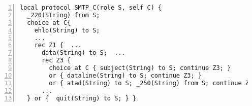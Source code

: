 \begin{lstlisting}[numbers=left]
local protocol SMTP_C(role S, self C) {
  _220(String) from S;
  choice at C{
    ehlo(String) to S;
    ...
    rec Z1 {  ...
      data(String) to S;  ...
      rec Z3 {
        choice at C { subject(String) to S; continue Z3; }
        or { dataline(String) to S; continue Z3; }
        or { atad(String) to S; _250(String) from S; continue Z1; } } }
      ...
  } or {  quit(String) to S; } }
\end{lstlisting}
%